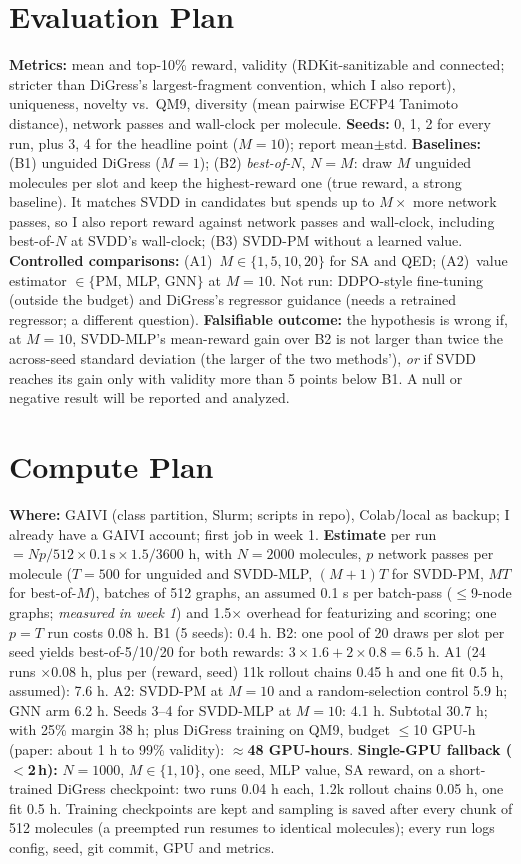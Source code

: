 \documentclass[10pt]{article}
\newcommand{\acc}{I already have a GAIVI account}
\begin{document}
\section{Evaluation Plan}
\textbf{Metrics:} mean and top-10\% reward, validity (RDKit-sanitizable and connected; stricter than DiGress's largest-fragment convention, which I also report), uniqueness, novelty vs.\ QM9, diversity (mean pairwise ECFP4 Tanimoto distance), network passes and wall-clock per molecule. \textbf{Seeds:} 0, 1, 2 for every run, plus 3, 4 for the headline point ($M{=}10$); report mean$\pm$std. \textbf{Baselines:} (B1) unguided DiGress ($M{=}1$); (B2) \emph{best-of-$N$}, $N{=}M$: draw $M$ unguided molecules per slot and keep the highest-reward one (true reward, a strong baseline). It matches SVDD in candidates but spends up to $M\times$ more network passes, so I also report reward against network passes and wall-clock, including best-of-$N$ at SVDD's wall-clock; (B3) SVDD-PM without a learned value. \textbf{Controlled comparisons:} (A1)~$M\in\{1,5,10,20\}$ for SA and QED; (A2)~value estimator $\in\{$PM, MLP, GNN$\}$ at $M{=}10$. Not run: DDPO-style fine-tuning (outside the budget) and DiGress's regressor guidance (needs a retrained regressor; a different question).
\textbf{Falsifiable outcome:} the hypothesis is wrong if, at $M{=}10$, SVDD-MLP's mean-reward gain over B2 is not larger than twice the across-seed standard deviation (the larger of the two methods'), \emph{or} if SVDD reaches its gain only with validity more than 5 points below B1. A null or negative result will be reported and analyzed.

\section{Compute Plan}\small
\textbf{Where:} GAIVI (class partition, Slurm; scripts in repo), Colab/local as backup; \acc{}; first job in week 1. \textbf{Estimate} per run $=N p/512\times0.1\,\mathrm{s}\times1.5/3600$ h, with $N{=}2000$ molecules, $p$ network passes per molecule ($T{=}500$ for unguided and SVDD-MLP, $(M{+}1)T$ for SVDD-PM, $MT$ for best-of-$M$), batches of 512 graphs, an assumed 0.1 s per batch-pass ($\le$9-node graphs; \emph{measured in week 1}) and 1.5$\times$ overhead for featurizing and scoring; one $p{=}T$ run costs 0.08 h.
B1 (5 seeds): 0.4 h. B2: one pool of 20 draws per slot per seed yields best-of-5/10/20 for both rewards: $3\times1.6+2\times0.8=6.5$ h. A1 (24 runs $\times0.08$ h, plus per (reward, seed) 11k rollout chains 0.45 h and one fit 0.5 h, assumed): 7.6 h. A2: SVDD-PM at $M{=}10$ and a random-selection control 5.9 h; GNN arm 6.2 h. Seeds 3--4 for SVDD-MLP at $M{=}10$: 4.1 h. Subtotal 30.7 h; with 25\% margin 38 h; plus DiGress training on QM9, budget $\le$10 GPU-h (paper: about 1 h to 99\% validity): \textbf{$\approx$48 GPU-hours}.
\textbf{Single-GPU fallback ($<$2\,h):} $N{=}1000$, $M\in\{1,10\}$, one seed, MLP value, SA reward, on a short-trained DiGress checkpoint: two runs 0.04 h each, 1.2k rollout chains 0.05 h, one fit 0.5 h. Training checkpoints are kept and sampling is saved after every chunk of 512 molecules (a preempted run resumes to identical molecules); every run logs config, seed, git commit, GPU and metrics.
\end{document}
